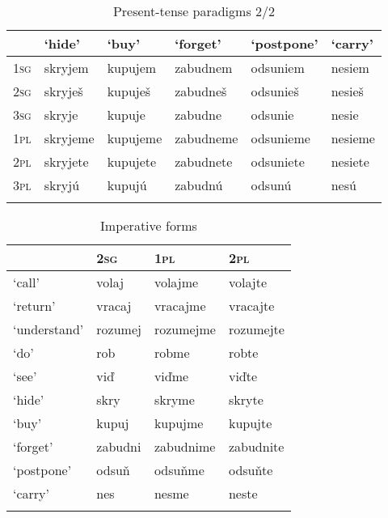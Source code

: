 \documentclass[output=paper,colorlinks,citecolor=brown,
]{langscibook}
\begin{document}
\begin{table}
\caption{Present-tense paradigms 2/2}
\label{tab:pitsch:2}
 \begin{tabular}{llllll}
  \lsptoprule
            & `hide' & `buy' & `forget' & `postpone' & `carry' \\
  \midrule
  \textsc{1sg} & skryjem & kupujem & zabudnem & odsuniem & nesiem \\
  \textsc{2sg} & skryješ & kupuješ & zabudneš & odsunieš & nesieš \\
  \textsc{3sg} & skryje & kupuje & zabudne & odsunie & nesie \\
  \textsc{1pl} & skryjeme & kupujeme & zabudneme & odsunieme & nesieme \\
  \textsc{2pl} & skryjete & kupujete & zabudnete & odsuniete & nesiete \\
  \textsc{3pl} & skryjú & kupujú & zabudnú & odsunú & nesú \\
  \lspbottomrule
 \end{tabular}
\end{table}


\begin{table}
\caption{Imperative forms}
\label{tab:pitsch:3}
 \begin{tabular}{llll}
  \lsptoprule
  & \textsc{2sg} & \textsc{1pl} & \textsc{2pl} \\
  \midrule
  `call' & volaj & volajme & volajte \\
  `return' & vracaj & vracajme & vracajte \\
  `understand' & rozumej & rozumejme & rozumejte \\
  `do' & rob & robme & robte \\
  `see' & viď & viďme & viďte \\
  `hide' & skry & skryme & skryte \\
  `buy' & kupuj & kupujme & kupujte \\
  `forget' & zabudni & zabudnime & zabudnite \\
  `postpone' & odsuň & odsuňme & odsuňte \\
  `carry' & nes & nesme & neste \\
  \lspbottomrule
 \end{tabular}
\end{table}

\end{document}
